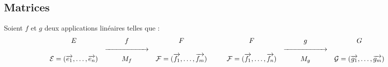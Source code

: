 \subsection{Matrices}
Soient $f$ et $g$ deux applications linéaires telles que :\\
\[\begin{matrix}
    E & f & F\\
    & \xrightarrow{\makebox[2cm]{}} &\\
    \mathcal{E}=(\vect{e_1},\dots,\vect{e_n}) & M_f &
    \mathcal{F}=(\vect{f_1},\dots,\vect{f_m})\\
\end{matrix}
\makebox[1cm]{}
\begin{matrix}
    F & g & G\\
    & \xrightarrow{\makebox[2cm]{}} &\\
    \mathcal{F}=(\vect{f_1},\dots,\vect{f_n}) & M_g &
    \mathcal{G}=(\vect{g_1},\dots,\vect{g_m})\\
\end{matrix}\]
